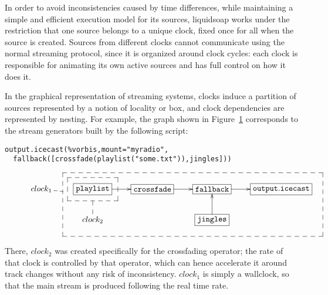 In order to avoid inconsistencies caused by time differences,
while maintaining a simple and efficient execution model for
its sources, liquidsoap works under the restriction that
one source belongs to a unique clock,
fixed once for all when the source is created.
Sources from different clocks cannot communicate using the normal
streaming protocol, since it is organized around clock cycles:
each clock is responsible for animating its own active sources
and has full control on how it does it.

In the graphical representation of streaming systems,
clocks induce a partition of sources represented by a notion of locality
or box, and clock dependencies are represented by nesting.
For example, the graph shown in Figure~\ref{fig:boxes}
corresponds to the stream generators built by the following
script:
\begin{verbatim}
output.icecast(%vorbis,mount="myradio",
  fallback([crossfade(playlist("some.txt")),jingles]))
\end{verbatim}

\begin{figure}[t]
 \begin{center}
\[
\def\f{\save
*+<15pt>[F--]\frm{}\ar @{--} "2,2"\restore}%
\def\g{\save
"2,4"."1,2"."1,5"!C*+<27pt>[F--]\frm{}\ar @{--} "1,1"\restore}%
\xymatrix{
   {clock_1} & *+[F]{\mathtt{playlist}}\ar[r]\f&*+[F]{\mathtt{crossfade}}\ar[r]&  *+[F]{\mathtt{fallback}}\ar[r]&
  *+[F]{\mathtt{output.icecast}}\\
   &{clock_2} &  & *+[F]{\mathtt{jingles}}\ar[u]\g& 
}
\]
\end{center}
 \label{fig:boxes}
\end{figure}

There, $clock_2$
was created specifically for the crossfading
operator; the rate of that clock is controlled by that operator,
which can hence accelerate it around track changes without any
risk of inconsistency.
$clock_1$ is simply a wallclock, so that the main stream
is produced following the real time rate.

